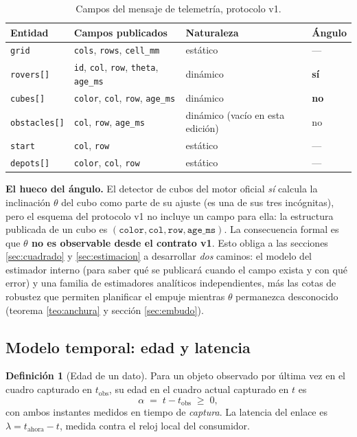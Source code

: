 \documentclass[11pt,a4paper]{article}
\theoremstyle{definition}
\newtheorem{definicion}[teorema]{Definición}
\begin{document}
\begin{table}[htbp]
\centering
\caption{Campos del mensaje de telemetría, protocolo v1.}
\begin{tabular}{llll}
\toprule
Entidad & Campos publicados & Naturaleza & Ángulo \\
\midrule
\texttt{grid}      & \texttt{cols}, \texttt{rows}, \texttt{cell\_mm} & estático & --- \\
\texttt{rovers[]}  & \texttt{id}, \texttt{col}, \texttt{row}, \texttt{theta}, \texttt{age\_ms} & dinámico & \textbf{sí} \\
\texttt{cubes[]}   & \texttt{color}, \texttt{col}, \texttt{row}, \texttt{age\_ms} & dinámico & \textbf{no} \\
\texttt{obstacles[]} & \texttt{col}, \texttt{row}, \texttt{age\_ms} & dinámico (vacío en esta edición) & no \\
\texttt{start}     & \texttt{col}, \texttt{row} & estático & --- \\
\texttt{depots[]}  & \texttt{color}, \texttt{col}, \texttt{row} & estático & --- \\
\bottomrule
\end{tabular}
\label{tab:contrato}
\end{table}

\begin{resultado}
\textbf{El hueco del ángulo.} El detector de cubos del motor oficial \emph{sí} calcula
la inclinación $\theta$ del cubo como parte de su ajuste (es una de sus tres
incógnitas), pero el esquema del protocolo v1 no incluye un campo para ella: la
estructura publicada de un cubo es $(\texttt{color},\texttt{col},\texttt{row},\texttt{age\_ms})$.
La consecuencia formal es que \textbf{$\theta$ no es observable desde el contrato v1}.
Esto obliga a las secciones \ref{sec:cuadrado} y \ref{sec:estimacion} a desarrollar
\emph{dos} caminos: el modelo del estimador interno (para saber qué se publicará
cuando el campo exista y con qué error) y una familia de estimadores analíticos
independientes, más las cotas de robustez que permiten planificar el empuje mientras
$\theta$ permanezca desconocido (teorema \ref{teo:anchura} y sección \ref{sec:embudo}).
\end{resultado}

\subsection{Modelo temporal: edad y latencia}

\begin{definicion}[Edad de un dato]
Para un objeto observado por última vez en el cuadro capturado en $t_{\mathrm{obs}}$,
su edad en el cuadro actual capturado en $t$ es
\begin{equation}
  \alpha \;=\; t - t_{\mathrm{obs}} \;\ge\; 0 ,
  \label{eq:edad}
\end{equation}
con ambos instantes medidos en tiempo de \emph{captura}. La latencia del enlace es
$\lambda = t_{\mathrm{ahora}} - t$, medida contra el reloj local del consumidor.
\end{definicion}
\end{document}
